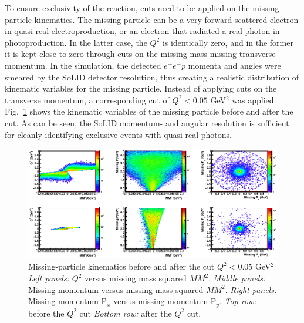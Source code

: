 To ensure exclusivity of the reaction, cuts need to be applied on the missing
particle kinematics. The missing particle can be a very forward scattered
electron in quasi-real electroproduction, or an electron that radiated a real
photon in photoproduction. In the latter case, the $Q^2$ is identically zero,
and in the former it is kept close to zero through cuts on the missing mass
missing transverse momentum.
In the simulation, the detected $e^+e^-p$ momenta and angles were smeared by
the SoLID detector resolution, thus creating a realistic distribution of
kinematic variables for the missing particle. Instead of applying cuts on the
transverse momentum, a corresponding cut of $Q^2 < 0.05$ GeV$^2$ was applied.
Fig.~\ref{fig:Miss_2D} shows the kinematic variables of the missing particle
before and after the cut. As can be seen, the SoLID momentum- and angular
resolution is sufficient for cleanly identifying exclusive events with
quasi-real photons.


\begin{figure}[t]
\includegraphics[width=125mm]{Miss_2D.eps}
\caption{\small{Missing-particle kinematics before and after the cut
$Q^2 < 0.05$ GeV$^2$
{\it Left panels:} $Q^2$ versus missing mass squared $MM^2$.
{\it Middle panels:} Missing momentum versus missing mass squared $MM^2$.
{\it Right panels:} Missing momentum P$_x$ versus missing momentum P$_y$.
{\it Top row:} before the $Q^2$ cut
{\it Bottom row:} after the $Q^2$ cut.}}
\label{fig:Miss_2D}
\end{figure}
